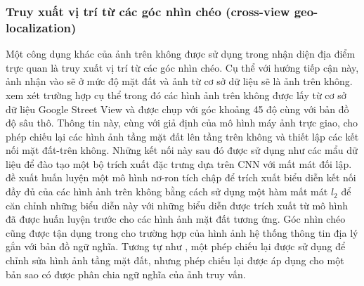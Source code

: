 \subsubsection{Truy xuất vị trí từ các góc nhìn chéo (cross-view geo-localization)}
Một công dụng khác của ảnh trên không được sử dụng trong nhận diện địa điểm trực quan là truy xuất vị trí từ các góc nhìn chéo. Cụ thể với hướng tiếp cận này, ảnh nhận vào sẽ ở mức độ mặt đất và ảnh từ cơ sở dữ liệu sẽ là ảnh trên không. \cite{Lin2015LearningDR} xem xét trường hợp cụ thể trong đó các hình ảnh trên không được lấy từ cơ sở dữ liệu Google Street View và được chụp với góc khoảng 45 độ cùng với bản đồ độ sâu thô. Thông tin này, cùng với giả định của mô hình máy ảnh trực giao, cho phép chiếu lại các hình ảnh tầng mặt đất lên tầng trên không và thiết lập các kết nối mặt đất-trên không. Những kết nối này sau đó được sử dụng như các mẩu dữ liệu để đào tạo một bộ trích xuất đặc trưng dựa trên CNN với mất mát đối lập. \cite{workman2015widearea} đề xuất huấn luyện một mô hình nơ-ron tích chập để trích xuất biểu diễn kết nối đầy đủ của các hình ảnh trên không bằng cách sử dụng một hàm mất mát $l_2$ để căn chỉnh những biểu diễn này với những biểu diễn được trích xuất từ mô hình đã được huấn luyện trước cho các hình ảnh mặt đất tương ứng. Góc nhìn chéo cũng được tận dụng trong \cite{Castaldo2015SemanticCM} cho trường hợp của hình ảnh hệ thống thông tin địa lý gắn với bản đồ ngữ nghĩa. Tương tự như \cite{Lin2015LearningDR}, một phép chiếu lại được sử dụng để chỉnh sửa hình ảnh tầng mặt đất, nhưng phép chiếu lại được áp dụng cho một bản sao có được phân chia ngữ nghĩa của ảnh truy vấn.